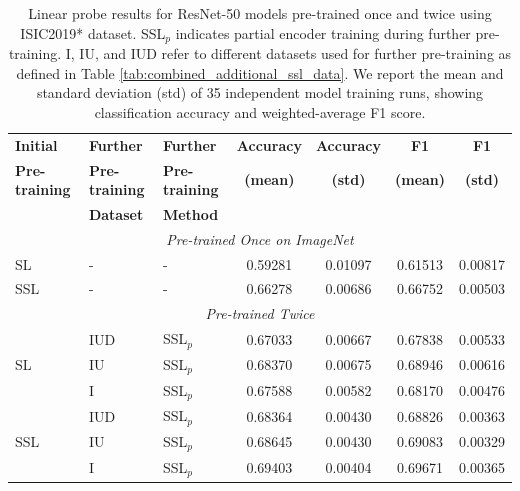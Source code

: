\documentclass[a4paper,fleqn]{cas-dc}
\begin{document}
\begin{table}[htbp!]
\centering
\begin{tabular}{lllcccc}
\toprule
\textbf{Initial} & \textbf{Further} & \textbf{Further} & \textbf{Accuracy} & \textbf{Accuracy} & \textbf{F1} & \textbf{F1} \\
\textbf{Pre-training} & \textbf{Pre-training} & \textbf{Pre-training} & \textbf{(mean)} & \textbf{(std)} & \textbf{(mean)} & \textbf{(std)} \\
& \textbf{Dataset} & \textbf{Method} & & & & \\ 
\midrule
\multicolumn{7}{c}{\textit{Pre-trained Once on ImageNet}} \\
\midrule
SL & - & - & 0.59281 & 0.01097 & 0.61513 & 0.00817 \\
SSL & - & - & 0.66278 & 0.00686 & 0.66752 & 0.00503 \\
\midrule
\multicolumn{7}{c}{\textit{Pre-trained Twice}} \\
\midrule
\multirow{3}{*}{SL} & IUD & SSL$_p$ & 0.67033 & 0.00667 & 0.67838 & 0.00533 \\
 & IU & SSL$_p$ & 0.68370 & 0.00675 & 0.68946 & 0.00616 \\
 & I & SSL$_p$ & 0.67588 & 0.00582 & 0.68170 & 0.00476 \\
\midrule
\multirow{3}{*}{SSL} & IUD & SSL$_p$ & 0.68364 & 0.00430 & 0.68826 & 0.00363 \\
 & IU & SSL$_p$ & 0.68645 & 0.00430 & 0.69083 & 0.00329 \\
 & I & SSL$_p$ & 0.69403 & 0.00404 & 0.69671 & 0.00365 \\
\bottomrule
\end{tabular}
\caption{%
Linear probe results for  ResNet-50 models  pre-trained once and twice using  ISIC2019* dataset. %
SSL$_p$ indicates partial encoder training during further pre-training. I, IU, and IUD refer to different datasets used for further pre-training as defined in Table \ref{tab:combined_additional_ssl_data}. We report the mean and standard deviation (std) of 35 independent model training runs, showing classification accuracy and weighted-average F1 score.}
\label{tab:combined_isic_linear_probe_results}
\end{table}
\end{document}
